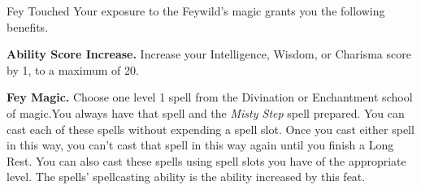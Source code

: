\begin{Card}[Feat]{Fey Touched}
Your exposure to the Feywild's magic grants you the following benefits.

\textbf{Ability Score Increase.} Increase your Intelligence, Wisdom, or Charisma score by 1, to a maximum of 20.\fmark
{}

\textbf{Fey Magic.} Choose one level 1 spell from the Divination or Enchantment school of magic.\fmark You always have that spell and the \textit{Misty Step} spell prepared. You can cast each of these spells without expending a spell slot. Once you cast either spell in this way, you can't cast that spell in this way again until you finish a Long Rest. You can also cast these spells using spell slots you have of the appropriate level. The spells' spellcasting ability is the ability increased by this feat.
\end{Card}


